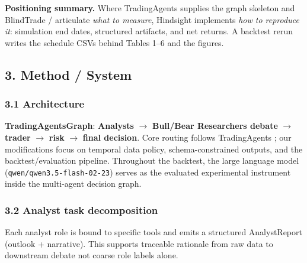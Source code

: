 \documentclass{article}
\begin{document}
\textbf{Positioning summary.} Where TradingAgents supplies the
graph skeleton and BlindTrade / \citet{nguyen2026toward}
articulate \emph{what to measure}, Hindsight implements \emph{how
to reproduce it}: simulation end dates, structured artifacts, and net returns. A backtest rerun writes the schedule CSVs behind Tables 1--6 and the figures.


\subsection{3. Method / System}\label{method-system}

\subsubsection{3.1 Architecture}\label{architecture}

\textbf{TradingAgentsGraph}: \textbf{Analysts} $\rightarrow$ \textbf{Bull/Bear
Researchers debate} $\rightarrow$ \textbf{trader} $\rightarrow$ \textbf{risk} $\rightarrow$ \textbf{final decision}.
Core routing follows TradingAgents \citep{xiao2024tradingagents}; our modifications focus on
temporal data policy, schema-constrained outputs, and the backtest/evaluation pipeline.
Throughout the backtest, the large language model (\texttt{qwen/qwen3.5-flash-02-23}) serves as the evaluated experimental instrument inside the multi-agent decision graph.

\subsubsection{3.2 Analyst task decomposition}\label{analyst-task-decomposition}

Each analyst role is bound to specific tools and emits a
structured AnalystReport (outlook + narrative). This
supports traceable rationale from raw data to downstream debate not
coarse role labels alone.
\end{document}
